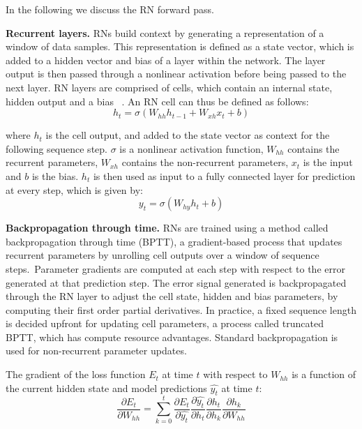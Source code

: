 \noindent In the following we discuss the RN forward pass. \par

\noindent \textbf{Recurrent layers.} RNs build context by generating a representation of a window of data samples. This representation is defined as a state vector, which is added to a hidden vector and bias of a layer within the network. The layer output is then passed through a nonlinear activation before being passed to the next layer. RN layers are comprised of cells, which contain an internal state, hidden output and a bias \unskip ~\citep{DLIndaba2018}. An RN cell can thus be defined as follows: 
\begin{equation}
	h_t = \sigma(W_{hh}h_{t-1} + W_{xh}x_t + b)
\end{equation}

\noindent where $h_t$ is the cell output, and added to the state vector as context for the following sequence step. $\sigma$ is a nonlinear activation function, $W_{hh}$ contains the recurrent parameters, $W_{xh}$ contains the non-recurrent parameters, $x_t$ is the input and $b$ is the bias. $h_t$ is then used as input to a fully connected layer for prediction at every step, which is given by:
\begin{equation}
	y_t = \sigma(W_{hy}h_{t} + b)
\end{equation}

\noindent \textbf{Backpropagation through time.} RNs are trained using a method called backpropagation through time (BPTT),  a gradient-based process that updates recurrent parameters by unrolling cell outputs over a window of sequence steps.\ Parameter gradients are computed at each step with respect to the error generated at that prediction step. The error signal generated is backpropagated through the RN layer to adjust the cell state, hidden and bias parameters, by computing their first order partial derivatives. In practice, a fixed sequence length is decided upfront for updating cell parameters, a process called truncated BPTT, which has compute resource advantages. Standard backpropagation is used for non-recurrent parameter updates. \par

\noindent The gradient of the loss function $ E_t $ at time $ t $ with respect to $ W_{hh} $ is a function of the current hidden state and model predictions $\hat{y_t}$ at time $ t $:  
\begin{equation}
	\frac{\partial E_t} {\partial W_{hh}} = \sum_{k=0}^{t}\frac{\partial E_t} {\partial \hat{y_t}}\frac{\partial \hat{y_t}} {\partial h_t}\frac{\partial h_t} {\partial h_k}\frac{\partial h_k} {\partial W_{hh}}
\end{equation}

